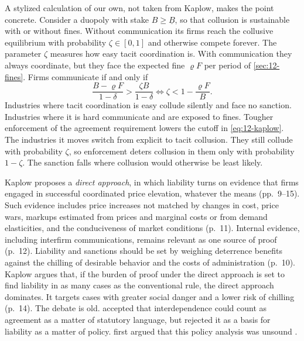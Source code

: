 A stylized calculation of our own, not taken from Kaplow, makes the point concrete. Consider a duopoly with stake
$B \ge \underline B$, so that collusion is sustainable with or without fines. Without communication its firms reach
the collusive equilibrium with probability $\zeta \in [0,1]$ and otherwise compete forever. The parameter $\zeta$
measures how easy tacit coordination is. With communication they always coordinate, but they
face the expected fine $\varrho F$ per period of \cref{sec:12-fines}. Firms communicate if and only if
\begin{equation}\label{eq:12-kaplow}
\frac{B - \varrho F}{1-\delta} > \frac{\zeta B}{1-\delta}
\iff \zeta < 1 - \frac{\varrho F}{B}.
\end{equation}
Industries where tacit coordination is easy collude silently and face no sanction. Industries where it is hard
communicate and are exposed to fines. Tougher enforcement of the agreement requirement lowers the cutoff in
\eqref{eq:12-kaplow}. The industries it moves switch from explicit to tacit collusion. They still collude with
probability $\zeta$, so enforcement deters collusion in them only with probability $1 - \zeta$. The sanction falls
where collusion would otherwise be least likely.

Kaplow proposes a \emph{direct approach}, in which liability turns on evidence that firms engaged in successful
coordinated price elevation, whatever the means (pp.~9--15). Such evidence includes price increases not matched
by changes in cost, price wars, markups estimated from prices and marginal costs or from demand elasticities, and
the conduciveness of market conditions (p.~11). Internal evidence, including interfirm communications, remains
relevant as one source of proof (p.~12). Liability and sanctions should be set by weighing deterrence benefits
against the chilling of desirable behavior and the costs of administration (p.~10). Kaplow argues that, if the
burden of proof under the direct approach is set to find liability in as many cases as the conventional rule, the
direct approach dominates. It targets cases with greater social danger and a lower risk of chilling (p.~14). The
debate is old. \citet{Turner1962} accepted that interdependence could count as agreement as a matter of statutory
language, but rejected it as a basis for liability as a matter of policy. \citet{Posner1969} first argued that this
policy analysis was unsound \citep[p.~447]{Kaplow2013}.


